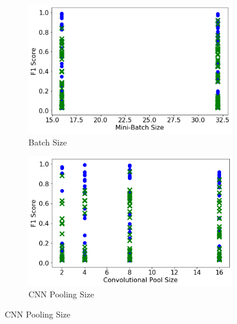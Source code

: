 \begin{figure}[H]
     \begin{subfigure}[b]{0.49\textwidth}
         \centering
         \includegraphics[width=\textwidth]{images/cnn_batch_size.png}
         \caption{Batch Size}
         \label{fig:cnn_batch_size}
     \end{subfigure}
     \hfill
     \begin{subfigure}[b]{0.49\textwidth}
         \centering
         \includegraphics[width=\textwidth]{images/cnn_pooling_size.png}
         \caption{CNN Pooling Size}
         \label{fig:cnn_pooling_size}
     \end{subfigure}


\end{figure}
